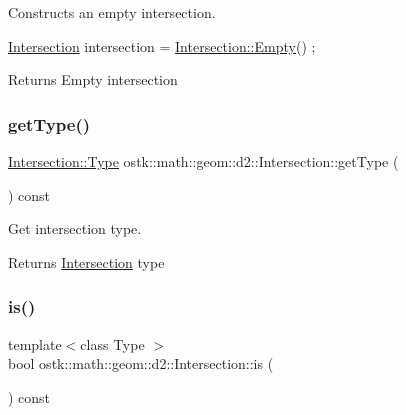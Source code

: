 Constructs an empty intersection. 


\begin{DoxyCode}
\hyperlink{classostk_1_1math_1_1geom_1_1d2_1_1_intersection_a52e7ba577832b73a1eb5c95eaddf2834}{Intersection} intersection = \hyperlink{classostk_1_1math_1_1geom_1_1d2_1_1_intersection_a983cc8c0c63c6239d2c7f0448d6db252}{Intersection::Empty}() ;
\end{DoxyCode}


\begin{DoxyReturn}{Returns}
Empty intersection 
\end{DoxyReturn}
\mbox{\label{classostk_1_1math_1_1geom_1_1d2_1_1_intersection_afc5b78c8fb68d890ff0066401bedaad4}} 
\subsubsection{\texorpdfstring{get\+Type()}{getType()}}
{\footnotesize\ttfamily \hyperlink{classostk_1_1math_1_1geom_1_1d2_1_1_intersection_a8712ffbb37647ed5212ff8ba6da68b00}{Intersection\+::\+Type} ostk\+::math\+::geom\+::d2\+::\+Intersection\+::get\+Type (\begin{DoxyParamCaption}{ }\end{DoxyParamCaption}) const}



Get intersection type. 

\begin{DoxyReturn}{Returns}
\hyperlink{classostk_1_1math_1_1geom_1_1d2_1_1_intersection}{Intersection} type 
\end{DoxyReturn}
\mbox{\label{classostk_1_1math_1_1geom_1_1d2_1_1_intersection_a9ddfce55fe0c6907b3ec573b1ad41029}} 
\subsubsection{\texorpdfstring{is()}{is()}}
{\footnotesize\ttfamily template$<$class Type $>$ \\
bool ostk\+::math\+::geom\+::d2\+::\+Intersection\+::is (\begin{DoxyParamCaption}{ }\end{DoxyParamCaption}) const\hspace{0.3cm}{\ttfamily [inline]}}



